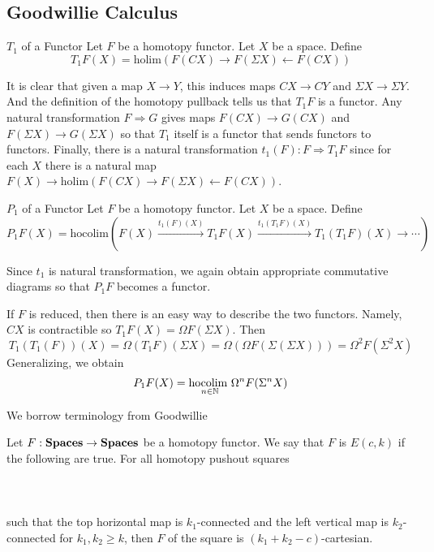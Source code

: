 \documentclass[a4paper]{article}
\begin{document}
\subsection{Goodwillie Calculus}
\begin{defn}{$T_1$ of a Functor}{} Let $F$ be a homotopy functor. Let $X$ be a space.  Define $$T_1F(X)=\text{holim}(F(CX)\rightarrow F(\Sigma X)\leftarrow F(CX))$$
\end{defn}

It is clear that given a map $X\to Y$, this induces maps $CX\to CY$ and $\Sigma X\to\Sigma Y$. And the definition of the homotopy pullback tells us that $T_1F$ is a functor. Any natural transformation $F\Rightarrow G$ gives maps $F(CX)\to G(CX)$ and $F(\Sigma X)\to G(\Sigma X)$ so that $T_1$ itself is a functor that sends functors to functors. Finally, there is a natural transformation $t_1(F):F\Rightarrow T_1F$ since for each $X$ there is a natural map $F(X)\to\text{holim}(F(CX)\rightarrow F(\Sigma X)\leftarrow F(CX))$. 

\begin{defn}{$P_1$ of a Functor}{} Let $F$ be a homotopy functor. Let $X$ be a space. Define $$P_1F(X)=\text{hocolim}(F(X)\overset{t_1(F)(X)}{\rightarrow}T_1F(X)\overset{t_1(T_1F)(X)}{\rightarrow}T_1(T_1F)(X)\rightarrow\cdots)$$
\end{defn}

Since $t_1$ is natural transformation, we again obtain appropriate commutative diagrams so that $P_1F$ becomes a functor. 

\begin{eg}{}{} If $F$ is reduced, then there is an easy way to describe the two functors. Namely, $CX$ is contractible so $T_1F(X)=\Omega F(\Sigma X)$. Then $$T_1(T_1(F))(X)=\Omega (T_1F)(\Sigma X)=\Omega(\Omega F(\Sigma(\Sigma X)))=\Omega^2 F(\Sigma^2 X)$$ Generalizing, we obtain $$P_1F(X)=\underset{n\in\mathbb{N}}{\text{hocolim }}\Omega^n F(\Sigma^n X)$$
\end{eg}

We borrow terminology from Goodwillie

\begin{defn}{}{} Let $F:\bold{Spaces}\to\bold{Spaces}$ be a homotopy functor. We say that $F$ is $E(c,k)$ if the following are true. For all homotopy pushout squares \\~\\
\\~\\
such that the top horizontal map is $k_1$-connected and the left vertical map is $k_2$-connected for $k_1,k_2\geq k$, then $F$ of the square is $(k_1+k_2-c)$-cartesian. 
\end{defn}
\end{document}

